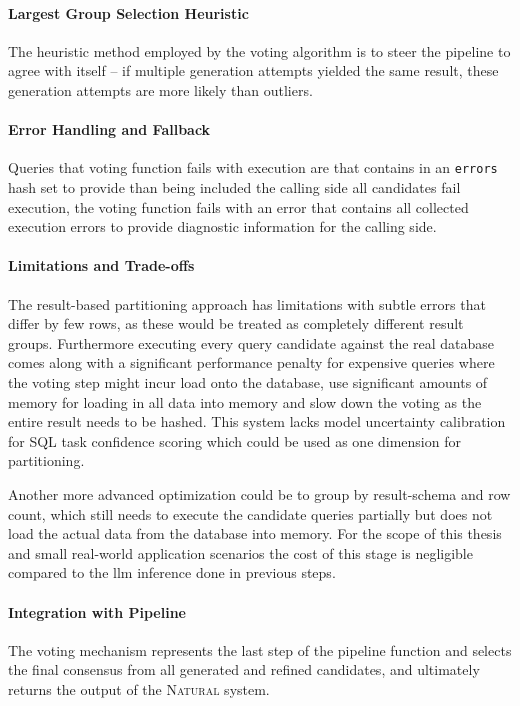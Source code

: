 \paragraph{Largest Group Selection Heuristic}

The heuristic method employed by the voting algorithm is to steer the pipeline
to agree with itself – if multiple generation attempts yielded the same result,
these generation attempts are more likely than outliers.

\paragraph{Error Handling and Fallback}

Queries that voting function fails with execution are that contains in an
\texttt{errors} hash set to provide than being included the calling side all
candidates fail execution, the voting function fails with an error that
contains all collected execution errors to provide diagnostic information for
the calling side.

\paragraph{Limitations and Trade-offs}

The result-based partitioning approach has limitations with subtle errors that
differ by few rows, as these would be treated as completely different result
groups. Furthermore executing every query candidate against the real database
comes along with a significant performance penalty for expensive queries where
the voting step might incur load onto the database, use significant amounts of
memory for loading in all data into memory and slow down the voting as the
entire result needs to be hashed. This system lacks model uncertainty
calibration for SQL task confidence scoring which could be used as one
dimension for partitioning.

Another more advanced optimization could be to group by result-schema and row
count, which still needs to execute the candidate queries partially but does
not load the actual data from the database into memory. For the scope of this
thesis and small real-world application scenarios the cost of this stage is
negligible compared to the llm inference done in previous steps. 

\paragraph{Integration with Pipeline}

The voting mechanism represents the last step of the pipeline function 
and selects the final consensus from all generated and refined candidates, 
and ultimately returns the output of the \textsc{Natural} system.
